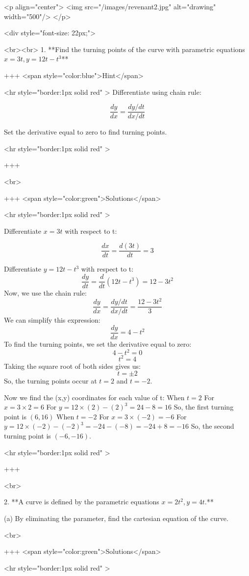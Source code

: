 <p align="center">
<img src="/images/revenant2.jpg" alt="drawing" width="500"/>
</p>

<div style="font-size: 22px;">

<br><br>
1. **Find the turning points of the curve with parametric equations $x=3 t, y=12 t-t^{3}$**

+++ <span style="color:blue">Hint</span>

<hr style="border:1px solid red" >
Differentiate using chain rule:

$$
\frac{dy}{dx} = \frac{dy/dt}{dx/dt}
$$

Set the derivative equal to zero to find turning points.

<hr style="border:1px solid red" >

+++

<br>

+++ <span style="color:green">Solutions</span>

<hr style="border:1px solid red" >

Differentiate $x=3t$ with respect to t:

$$
\frac{dx}{dt} = \frac{d(3t)}{dt} = 3
$$

Differentiate $y=12t−t^3$ with respect to t:
$$
\frac{dy}{dt} = \frac{d}{dt}(12t - t^3) = 12 - 3t^2
$$
Now, we use the chain rule:
$$
\frac{dy}{dx} = \frac{dy/dt}{dx/dt} = \frac{12 - 3t^2}{3}
$$
We can simplify this expression:
$$
\frac{dy}{dx} = 4 - t^2
$$
To find the turning points, we set the derivative equal to zero:
$$
4 - t^2 = 0
$$
$$
t^2 = 4
$$
Taking the square root of both sides gives us:
$$
t = \pm 2
$$
So, the turning points occur at $t=2$ and $t=−2$.

Now we find the (x,y) coordinates for each value of t:
When $t=2$
For $x=3\times 2=6$
For $y=12 \times (2)−(2)^3 =24−8=16$
So, the first turning point is $(6,16)$
When $t=−2$
For $x=3\times(−2)=−6$
For $y=12\times(−2)−(−2)^3=−24−(−8)=−24+8=−16$
So, the second turning point is $(−6,−16)$.

<hr style="border:1px solid red" >

+++

<br>

2. **A curve is defined by the parametric equations $x=2 t^{2}, y=4 t$.**

(a) By eliminating the parameter, find the cartesian equation of the curve.

<br>

+++ <span style="color:green">Solutions</span>

<hr style="border:1px solid red" >

